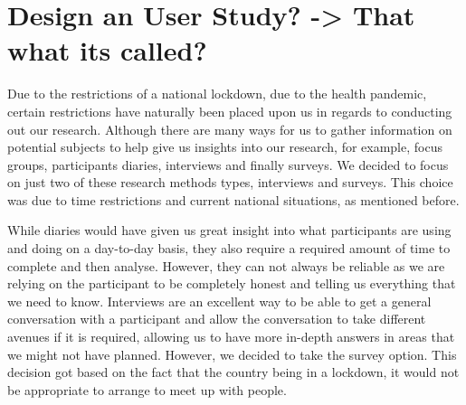 \documentclass{sigchi}
\begin{document}


\section{Design an User Study? -> That what its called?}


	
	Due to the restrictions of a national lockdown, due to the health pandemic, certain restrictions have naturally been placed upon us in regards to conducting out our research. Although there are many ways for us to gather information on potential subjects to help give us insights into our research, for example, focus groups, participants diaries, interviews and finally surveys. We decided to focus on just two of these research methods types, interviews and surveys. This choice was due to time restrictions and current national situations, as mentioned before. 
	
	While diaries would have given us great insight into what participants are using and doing on a day-to-day basis, they also require a required amount of time to complete and then analyse. However, they can not always be reliable as we are relying on the participant to be completely honest and telling us everything that we need to know. Interviews are an excellent way to be able to get a general conversation with a participant and allow the conversation to take different avenues if it is required, allowing us to have more in-depth answers in areas that we might not have planned. However, we decided to take the survey option. This decision got based on the fact that the country being in a lockdown, it would not be appropriate to arrange to meet up with people.
	
\end{document}
